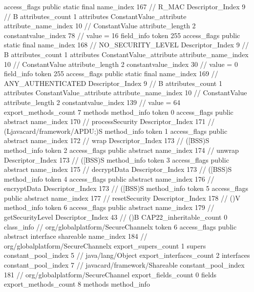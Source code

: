 {{{{{				access_flags	public static final
				name_index	167		// R_MAC
				Descriptor_Index	9		// B
				attributes_count	1
				attributes {
				ConstantValue_attribute {
					attribute_name_index	10		// ConstantValue
					attribute_length	2
					constantvalue_index	78		// value = 16
				}
				}
			}
			field_info {
				token	255
				access_flags	public static final
				name_index	168		// NO_SECURITY_LEVEL
				Descriptor_Index	9		// B
				attributes_count	1
				attributes {
				ConstantValue_attribute {
					attribute_name_index	10		// ConstantValue
					attribute_length	2
					constantvalue_index	30		// value = 0
				}
				}
			}
			field_info {
				token	255
				access_flags	public static final
				name_index	169		// ANY_AUTHENTICATED
				Descriptor_Index	9		// B
				attributes_count	1
				attributes {
				ConstantValue_attribute {
					attribute_name_index	10		// ConstantValue
					attribute_length	2
					constantvalue_index	139		// value = 64
				}
				}
			}
			}
			export_methods_count	7
			methods {
				method_info {
					token	0
					access_flags	public abstract
					name_index	170		// processSecurity
					Descriptor_Index	171		// (Ljavacard/framework/APDU;)S
				}
				method_info {
					token	1
					access_flags	public abstract
					name_index	172		// wrap
					Descriptor_Index	173		// ([BSS)S
				}
				method_info {
					token	2
					access_flags	public abstract
					name_index	174		// unwrap
					Descriptor_Index	173		// ([BSS)S
				}
				method_info {
					token	3
					access_flags	public abstract
					name_index	175		// decryptData
					Descriptor_Index	173		// ([BSS)S
				}
				method_info {
					token	4
					access_flags	public abstract
					name_index	176		// encryptData
					Descriptor_Index	173		// ([BSS)S
				}
				method_info {
					token	5
					access_flags	public abstract
					name_index	177		// resetSecurity
					Descriptor_Index	178		// ()V
				}
				method_info {
					token	6
					access_flags	public abstract
					name_index	179		// getSecurityLevel
					Descriptor_Index	43		// ()B
				}
			}
			CAP22_inheritable_count	0
		}
		class_info {		// org/globalplatform/SecureChannelx
			token	6
			access_flags	public abstract interface shareable
			name_index	184		// org/globalplatform/SecureChannelx
			export_supers_count	1
			supers {
				constant_pool_index	5		// java/lang/Object
			}
			export_interfaces_count	2
			interfaces {
				constant_pool_index	7		// javacard/framework/Shareable
				constant_pool_index	181		// org/globalplatform/SecureChannel
			}
			export_fields_count	0
			fields {
			}
			export_methods_count	8
			methods {
				method_info {
}}}}}
